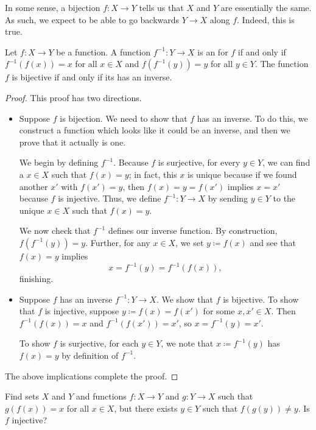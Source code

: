 \documentclass[../notes.tex]{subfiles}
\begin{document}
In some sense, a bijection $f\colon X\to Y$ tells us that $X$ and $Y$ are essentially the same. As such, we expect to be able to go backwards $Y\to X$ along $f$. Indeed, this is true.
\begin{prop} \label{prop:bij-is-iso}
    Let $f\colon X\to Y$ be a function. A function $f^{-1}\colon Y\to X$ is an  for $f$ if and only if $f^{-1}(f(x))=x$ for all $x\in X$ and $f\left(f^{-1}(y)\right)=y$ for all $y\in Y$. The function $f$ is bijective if and only if its has an inverse.
\end{prop}
\begin{proof}
    This proof has two directions.
    \begin{itemize}
        \item Suppose $f$ is bijection. We need to show that $f$ has an inverse. To do this, we construct a function which looks like it could be an inverse, and then we prove that it actually is one.
        
        We begin by defining $f^{-1}$. Because $f$ is surjective, for every $y \in Y$, we can find a $x \in X$ such that $f(x) = y$; in fact, this $x$ is unique because if we found another $x'$ with $f(x')=y$, then $f(x)=y=f(x')$ implies $x=x'$ because $f$ is injective. Thus, we define $f^{-1}\colon Y\to X$ by sending $y\in Y$ to the unique $x\in X$ such that $f(x)=y$.
        
        We now check that $f^{-1}$ defines our inverse function. By construction, $f\left(f^{-1}(y)\right)=y$. Further, for any $x\in X$, we set $y\coloneqq f(x)$ and see that $f(x)=y$ implies
        \[x=f^{-1}(y)=f^{-1}(f(x)),\]
        finishing.
        
        \item Suppose $f$ has an inverse $f^{-1}\colon Y\to X$. We show that $f$ is bijective. To show that $f$ is injective, suppose $y\coloneqq f(x)=f(x')$ for some $x,x'\in X$. Then $f^{-1}(f(x))=x$ and $f^{-1}(f(x'))=x'$, so $x=f^{-1}(y)=x'$.

        To show $f$ is surjective, for each $y\in Y$, we note that $x\coloneqq f^{-1}(y)$ has $f(x)=y$ by definition of $f^{-1}$.
    \end{itemize}
    The above implications complete the proof.
\end{proof}
\begin{exe}
    Find sets $X$ and $Y$ and functions $f\colon X\to Y$ and $g\colon Y\to X$ such that $g(f(x))=x$ for all $x\in X$, but there exists $y\in Y$ such that $f(g(y))\ne y$. Is $f$ injective?
\end{exe}
\end{document}
